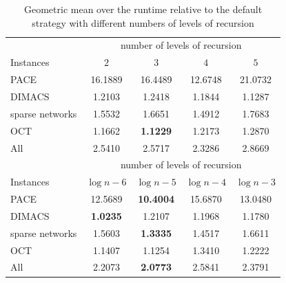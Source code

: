 \documentclass[12pt,a4paper,twoside]{scrartcl}
\numberwithin{equation}{section}
\begin{document}
\begin{table}[hbt!]
	\centering
	\begin{tabular}{l|cccc|}	  & \multicolumn{4}{c|}{number of levels of recursion} \\ \cline{2-5}
		Instances & $2$ & $3$ & $4$ & $5$ \\
		\hline
		PACE & 16.1889 & 16.4489 & 12.6748 & 21.0732 \\
		DIMACS & 1.2103 & 1.2418 & 1.1844 & 1.1287  \\
		sparse networks & 1.5532 & 1.6651 & 1.4912 & 1.7683  \\
		OCT & 1.1662 & \textbf{1.1229} & 1.2173 & 1.2870  \\
		All & 2.5410 & 2.5717 & 2.3286 & 2.8669 \\ \hline \hline
		& \multicolumn{4}{c|}{number of levels of recursion} \\ \cline{2-5}
		Instances & $\log n -6$ & $\log n -5$ & $\log n -4$ & $\log n -3$ \\
		\hline
		PACE & 12.5689 & \textbf{10.4004} & 15.6870 & 13.0480  \\
		DIMACS & \textbf{1.0235} & 1.2107 & 1.1968& 1.1780  \\
		sparse networks & 1.5603 & \textbf{1.3335} & 1.4517 & 1.6611  \\
		OCT & 1.1407 & 1.1254 & 1.3410 & 1.2222  \\
		All & 2.2073 & \textbf{2.0773} & 2.5841 & 2.3791  \\ \hline
		
	\end{tabular}
	\caption{Geometric mean over the runtime relative to the default strategy with different numbers of levels of recursion}
	\label{tab:thresh1}
	
\end{table}
\end{document}
